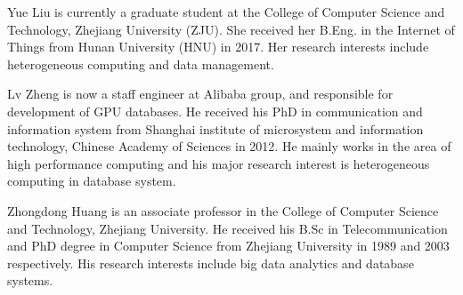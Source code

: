 \documentclass[10pt,journal,compsoc]{IEEEtran}
\begin{document}
%
\begin{IEEEbiography}
	{Yue Liu} is currently a graduate student at the College of Computer Science and Technology, Zhejiang University (ZJU). She received her B.Eng. in the Internet of Things from Hunan University (HNU) in 2017. Her research interests include heterogeneous computing and data management.
\end{IEEEbiography}
%
\begin{IEEEbiography}
	{Lv Zheng} is now a staff engineer at Alibaba group, and responsible for development of GPU databases. He received his PhD in communication and information system from Shanghai institute of microsystem and information technology, Chinese Academy of Sciences in 2012. He mainly works in the area of high performance computing and his major research interest is heterogeneous computing in database system.
\end{IEEEbiography}
%
\begin{IEEEbiography}
	{Zhongdong Huang} is an associate professor in the College of Computer Science and Technology, Zhejiang University. He received his B.Sc in Telecommunication and PhD degree in Computer Science from Zhejiang University in 1989 and 2003 respectively. His research interests include big data analytics and database systems.
\end{IEEEbiography}
\end{document}

